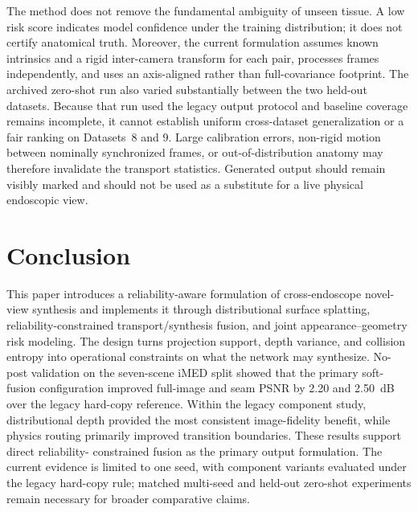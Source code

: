 \documentclass[letterpaper,10pt,conference]{ieeeconf}
\begin{document}
The method does not remove the fundamental ambiguity of unseen tissue. A low
risk score indicates model confidence under the training distribution; it does
not certify anatomical truth. Moreover, the current formulation assumes known
intrinsics and a rigid inter-camera transform for each pair, processes frames
independently, and uses an axis-aligned rather than full-covariance footprint.
The archived zero-shot run also varied substantially between the two held-out
datasets. Because that run used the legacy output protocol and baseline
coverage remains incomplete, it cannot establish uniform cross-dataset
generalization or a fair ranking on Datasets~8 and 9.
Large calibration errors, non-rigid motion between nominally synchronized
frames, or out-of-distribution anatomy may therefore invalidate the transport
statistics. Generated output should remain visibly marked and should not be
used as a substitute for a live physical endoscopic view.

\section{Conclusion}
\label{sec:conclusion}

This paper introduces a reliability-aware formulation of cross-endoscope
novel-view synthesis and implements it through distributional surface
splatting, reliability-constrained transport/synthesis fusion, and
joint appearance--geometry risk modeling. The design
turns projection support, depth variance, and collision entropy into operational
constraints on what the network may synthesize. No-post validation on the
seven-scene iMED split showed that the primary soft-fusion configuration
improved full-image and seam PSNR by 2.20 and 2.50~dB over the legacy hard-copy
reference. Within the legacy component study, distributional depth provided
the most consistent image-fidelity benefit, while physics routing primarily
improved transition boundaries. These results support direct reliability-
constrained fusion as the primary output formulation. The current evidence is
limited to one seed, with component variants evaluated under the legacy
hard-copy rule; matched multi-seed and held-out zero-shot experiments remain
necessary for broader comparative claims.



\end{document}
